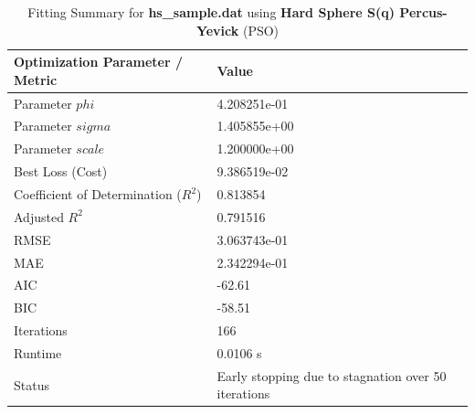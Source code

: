 \begin{table}[htbp]
\centering
\caption{Fitting Summary for \textbf{hs_sample.dat} using \textbf{Hard Sphere S(q) Percus-Yevick} (PSO)}
\begin{tabular}{ll}
\hline\hline
\textbf{Optimization Parameter / Metric} & \textbf{Value} \\
\hline
Parameter $phi$ & 4.208251e-01 \\
Parameter $sigma$ & 1.405855e+00 \\
Parameter $scale$ & 1.200000e+00 \\
\hline
Best Loss (Cost) & 9.386519e-02 \\
Coefficient of Determination ($R^2$) & 0.813854 \\
Adjusted $R^2$ & 0.791516 \\
RMSE & 3.063743e-01 \\
MAE & 2.342294e-01 \\
AIC & -62.61 \\
BIC & -58.51 \\
\hline
Iterations & 166 \\
Runtime & 0.0106 s \\
Status & Early stopping due to stagnation over 50 iterations \\
\hline\hline
\end{tabular}
\label{tab:edibot_fit_hs_sample_dat}
\end{table}
